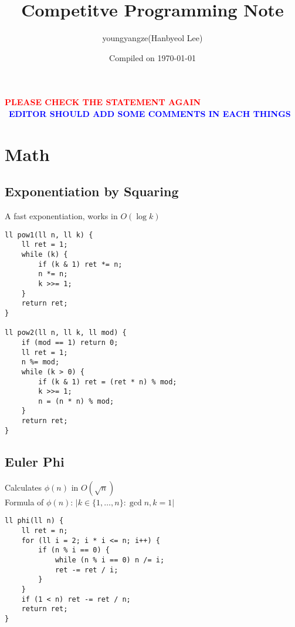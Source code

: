 \documentclass[landscape, 8pt, a4paper, oneside, twocolumn]{extarticle}
\title{Competitve Programming Note}
\author{youngyangze(Hanbyeol Lee)}
\date{Compiled on \today}
\begin{document}
 {
	\Large

	\maketitle

\tableofcontents
}
\thispagestyle{fancy}
\pagebreak
\textcolor{red}{\textbf{PLEASE CHECK THE STATEMENT AGAIN}}\\
\, \textcolor{blue}{\textbf{EDITOR SHOULD ADD SOME COMMENTS IN EACH THINGS}}
\section{Math}
\subsection{Exponentiation by Squaring}
{A fast exponentiation, works in $O(\log k)$}
\begin{verbatim}
ll pow1(ll n, ll k) {
    ll ret = 1;
    while (k) {
        if (k & 1) ret *= n;
        n *= n;
        k >>= 1;
    }
    return ret;
}

ll pow2(ll n, ll k, ll mod) {
    if (mod == 1) return 0;
    ll ret = 1;
    n %= mod;
    while (k > 0) {
        if (k & 1) ret = (ret * n) % mod;
        k >>= 1;
        n = (n * n) % mod;
    }
    return ret;
}
\end{verbatim}
\subsection{Euler Phi}
{Calculates $\phi(n)$ in $O(\sqrt{n})$}\\
{Formula of $\phi(n)$: $|k\in \{1,\dots,n\}:\gcd{n,k}=1|$}
\begin{verbatim}
ll phi(ll n) {
    ll ret = n;
    for (ll i = 2; i * i <= n; i++) {
        if (n % i == 0) {
            while (n % i == 0) n /= i;
            ret -= ret / i;
        }
    }
    if (1 < n) ret -= ret / n;
    return ret;
}
\end{verbatim}
\end{document}
